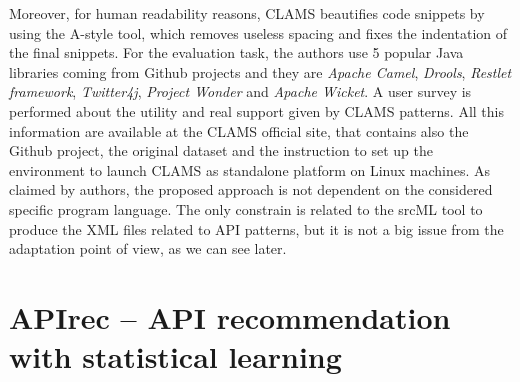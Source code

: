 Moreover, for human readability reasons, CLAMS beautifies code snippets by 
using the A-style tool, which removes useless spacing and fixes the indentation 
of the final snippets. For the evaluation task, the authors use 5 popular Java 
libraries coming from Github projects and they are \textit{Apache Camel}, 
\textit{Drools}, \textit{Restlet framework}, \textit{Twitter4j}, 
\textit{Project Wonder} and \textit{Apache Wicket}. 
A user survey is performed about the utility and real support given by CLAMS 
patterns. All this information are available at the CLAMS official site, that 
contains also the Github project, the original dataset and the instruction to 
set up the environment to launch CLAMS as standalone platform on Linux 
machines. As claimed by authors, the proposed approach is not dependent on the 
considered specific program language. The only constrain is related to the 
srcML tool to produce the XML files related to API patterns, but it is not a 
big issue from the adaptation point of view, as we can see later.



\section{APIrec -- API recommendation with statistical learning}

